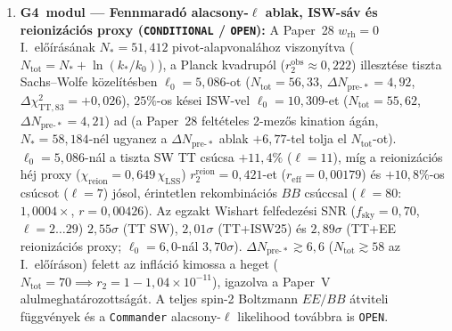 \documentclass[11pt,a4paper]{article}
\begin{document}
\begin{enumerate}
\item \textbf{G4~modul --- Fennmaradó alacsony-$\ell$ ablak, ISW-sáv és reionizációs proxy (\texttt{CONDITIONAL} / \texttt{OPEN}):} A Paper~28 $w_{\mathrm{rh}}=0$ I.~előírásának $N_* = 51{,}412$ pivot-alapvonalához viszonyítva ($N_{\mathrm{tot}} = N_* + \ln(k_*/k_0)$), a Planck kvadrupól ($r_2^{\mathrm{obs}}\approx 0{,}222$) illesztése tiszta Sachs--Wolfe közelítésben $\ell_0 = 5{,}086$-ot ($N_{\mathrm{tot}} = 56{,}33$, $\Delta N_{\mathrm{pre}\text{-}*}=4{,}92$, $\Delta\chi^2_{\mathrm{TT,83}}=+0{,}026$), $25\%$-os kései ISW-vel $\ell_0 = 10{,}309$-et ($N_{\mathrm{tot}}=55{,}62$, $\Delta N_{\mathrm{pre}\text{-}*}=4{,}21$) ad (a Paper~28 feltételes 2-mezős kination ágán, $N_*=58{,}184$-nél ugyanez a $\Delta N_{\mathrm{pre}\text{-}*}$ ablak $+6{,}77$-tel tolja el $N_{\mathrm{tot}}$-ot). $\ell_0 = 5{,}086$-nál a tiszta SW TT csúcsa $+11{,}4\%$ ($\ell=11$), míg a reionizációs héj proxy ($\chi_{\mathrm{reion}} = 0{,}649\,\chi_{\mathrm{LSS}}$) $r_2^{\mathrm{reion}} = 0{,}421$-et ($r_{\mathrm{eff}} = 0{,}00179$) és $+10{,}8\%$-os csúcsot ($\ell=7$) jósol, érintetlen rekombinációs $BB$ csúccsal ($\ell=80$: $1{,}0004\times$, $r = 0{,}00426$). Az egzakt Wishart felfedezési SNR ($f_{\mathrm{sky}} = 0{,}70$, $\ell=2\dots 29$) $2{,}55\sigma$ (TT SW), $2{,}01\sigma$ (TT+ISW25) és $2{,}89\sigma$ (TT+EE reionizációs proxy; $\ell_0 = 6{,}0$-nál $3{,}70\sigma$). $\Delta N_{\mathrm{pre}\text{-}*}\gtrsim 6{,}6$ ($N_{\mathrm{tot}}\gtrsim 58$ az I.~előíráson) felett az infláció kimossa a heget ($N_{\mathrm{tot}}=70 \implies r_2 = 1 - 1{,}04\times 10^{-11}$), igazolva a Paper~V alulmeghatározottságát. A teljes spin-2 Boltzmann $EE/BB$ átviteli függvények és a \texttt{Commander} alacsony-$\ell$ likelihood továbbra is \texttt{OPEN}.
\end{enumerate}
\end{document}
